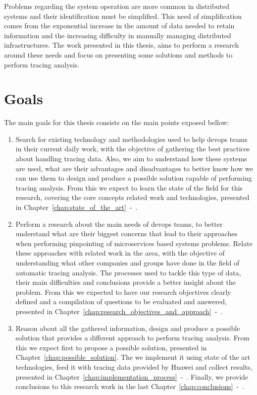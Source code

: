 Problems regarding the system operation are more common in distributed systems and their identification must be simplified. This need of simplification comes from the exponential increase in the amount of data needed to retain information and the increasing difficulty in manually managing distributed infrastructures. The work presented in this thesis, aims to perform a research around these needs and focus on presenting some solutions and methods to perform tracing analysis.

\section{Goals}
\label{sec:goals}

The main goals for this thesis consists on the main points exposed bellow:

\begin{enumerate}
    \item Search for existing technology and methodologies used to help \gls{devops} teams in their current daily work, with the objective of gathering the best practices about handling tracing data. Also, we aim to understand how these systems are used, what are their advantages and disadvantages to better know how we can use them to design and produce a possible solution capable of performing tracing analysis. From this we expect to learn the state of the field for this research, covering the core concepts related work and technologies, presented in Chapter~\ref{chap:state_of_the_art}~-~.
    \item Perform a research about the main needs of \gls{devops} teams, to better understand what are their biggest concerns that lead to their approaches when performing pinpointing of microservices based systems problems. Relate these approaches with related work in the area, with the objective of understanding what other companies and groups have done in the field of automatic tracing analysis. The processes used to tackle this type of data, their main difficulties and conclusions provide a better insight about the problem. From this we expected to have our research objectives clearly defined and a compilation of questions to be evaluated and answered, presented in Chapter~\ref{chap:research_objectives_and_approach}~-~.
    \item Reason about all the gathered information, design and produce a possible solution that provides a different approach to perform tracing analysis. From this we expect first to propose a possible solution, presented in Chapter~\ref{chap:possible_solution}. The we implement it using state of the art technologies, feed it with tracing data provided by Huawei and collect results, presented in Chapter~\ref{chap:implementation_process}~-~. Finally, we provide conclusions to this research work in the last Chapter~\ref{chap:conclusions}~-~.    
\end{enumerate}

